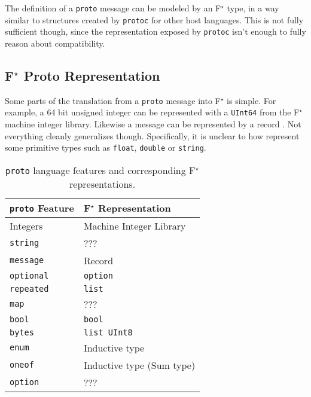 \documentclass[11pt]{article}
\newcommand{\fstar}{F\(^\star\)}
\begin{document}
The definition of a \texttt{proto} message can be modeled by an \fstar{} type,
in a way similar to structures created by \texttt{protoc} for other host
languages. This is not fully sufficient though, since the representation
exposed by \texttt{protoc} isn't enough to fully reason about compatibility.

\subsection{\fstar{} Proto Representation}

Some parts of the translation from a \texttt{proto} message
\autocite{LanguageGuideProto} into \fstar{} is simple. For example, a 64 bit
unsigned integer can be represented with a \texttt{UInt64} from the \fstar{}
machine integer library. Likewise a message can be represented by a record
\autocite{swamy2023proof}. Not everything cleanly generalizes
though. Specifically, it is unclear to how represent some primitive types such
as \texttt{float}, \texttt{double} or \texttt{string}.

\begin{table}[H]
	\centering
	\begin{tabular}{ll}
		\toprule
		\texttt{proto} Feature & \fstar{} Representation   \\
		\midrule
		Integers               & Machine Integer Library   \\
		\texttt{string}        & ???                       \\
		\texttt{message}       & Record                    \\
		\texttt{optional}      & \texttt{option}           \\
		\texttt{repeated}      & \texttt{list}             \\
		\texttt{map}           & ???                       \\
		\texttt{bool}          & \texttt{bool}             \\
		\texttt{bytes}         & \texttt{list UInt8}       \\
		\texttt{enum}          & Inductive type            \\
		\texttt{oneof}         & Inductive type (Sum type) \\
		\texttt{option}        & ???                       \\
		\bottomrule
	\end{tabular}

	\vspace{4mm}
	\caption[]{\texttt{proto} language features and corresponding \fstar{} representations.}
\end{table}
\end{document}
